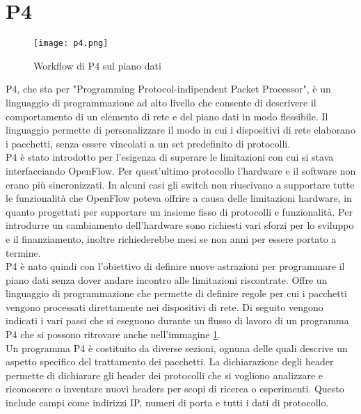 \section{P4}
\begin{figure}[h]
    \centering
   \texttt{[image: p4.png]}
    \caption{Workflow di P4 sul piano dati}
    \label{fig:p4}
\end{figure}
P4, che sta per "Programming Protocol-indipendent Packet Processor",  è un linguaggio di programmazione ad alto livello che consente di descrivere il comportamento di un elemento di rete e del piano dati in modo flessibile.
Il linguaggio permette di personalizzare il modo in cui i dispositivi di rete elaborano i pacchetti, senza essere vincolati a un set predefinito di protocolli.
\\P4 è stato introdotto per l'esigenza di superare le limitazioni con cui si stava interfacciando OpenFlow.
Per quest'ultimo protocollo l'hardware e il software non erano più sincronizzati. In alcuni casi 
gli switch non riuscivano a supportare tutte le funzionalità che OpenFlow poteva offrire a causa delle limitazioni hardware, in quanto progettati per supportare un insieme fisso di protocolli e funzionalità. 
Per introdurre un cambiamento dell'hardware sono richiesti vari sforzi per lo sviluppo e il finanziamento, inoltre richiederebbe mesi se non anni per essere portato a termine.
\\P4 è nato quindi con l'obiettivo di definire nuove astrazioni per programmare il piano dati senza dover andare incontro alle limitazioni riscontrate.
Offre un linguaggio di programmazione che permette di definire regole per cui i pacchetti vengono processati direttamente nei dispositivi di rete.
Di seguito vengono indicati i vari passi che si eseguono durante un flusso di lavoro di un programma P4 che si possono ritrovare anche nell'immagine \ref{fig:p4}.
\\Un programma P4 è costituito da diverse sezioni, ognuna delle quali descrive un aspetto specifico del trattamento dei pacchetti.
La dichiarazione degli header permette di dichiarare gli header dei protocolli che si vogliono analizzare e riconoscere o inventare nuovi headers per scopi di ricerca o esperimenti.
Questo include campi come indirizzi IP, numeri di porta e tutti i dati di protocollo.
